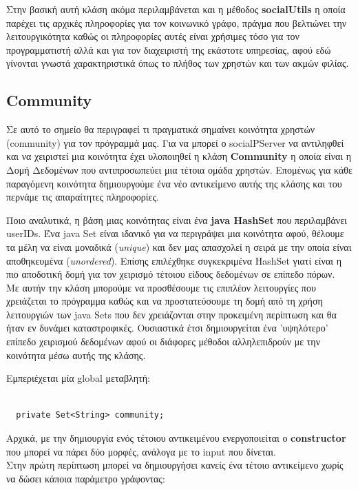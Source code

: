 Στην βασική αυτή κλάση ακόμα περιλαμβάνεται και η μέθοδος \textbf{socialUtils} η οποία παρέχει τις αρχικές πληροφορίες για τον κοινωνικό γράφο,
πράγμα που βελτιώνει την λειτουργικότητα καθώς οι πληροφορίες αυτές είναι χρήσιμες τόσο για τον προγραμματιστή
αλλά και για τον διαχειριστή της εκάστοτε υπηρεσίας, αφού εδώ γίνονται γνωστά χαρακτηριστικά όπως το πλήθος των χρηστών και των ακμών φιλίας.


\subsection{Community}
\label{Community}
\noindent
Σε αυτό το σημείο θα περιγραφεί τι πραγματικά σημαίνει κοινότητα χρηστών (community) για τον πρόγραμμά μας.
Για να μπορεί ο socialPServer να αντιληφθεί και να χειριστεί μια κοινότητα έχει υλοποιηθεί η κλάση \textbf{Community}
η οποία είναι η Δομή Δεδομένων που αντιπροσωπεύει μια τέτοια ομάδα χρηστών.
Επομένως για κάθε παραγόμενη κοινότητα δημιουργούμε ένα νέο αντικείμενο αυτής της κλάσης και του περνάμε τις απαραίτητες πληροφορίες.

Ποιο αναλυτικά, η βάση μιας κοινότητας είναι ένα \textbf{java HashSet} που περιλαμβάνει userIDs.
Ένα java Set είναι ιδανικό για να περιγράψει μια κοινότητα αφού, θέλουμε τα μέλη να είναι μοναδικά (\emph{unique}) 
και δεν μας απασχολεί η σειρά με την οποία είναι αποθηκευμένα (\emph{unordered}).
Επίσης επιλέχθηκε συγκεκριμένα HashSet γιατί είναι η πιο αποδοτική δομή για τον χειρισμό τέτοιου είδους δεδομένων σε επίπεδο πόρων.\\
Με αυτήν την κλάση μπορούμε να προσθέσουμε τις επιπλέον λειτουργίες που χρειάζεται το πρόγραμμα καθώς και να προστατεύσουμε τη δομή από τη χρήση λειτουργιών των java Sets που
δεν χρειάζονται στην προκειμένη περίπτωση και θα ήταν εν δυνάμει καταστροφικές. Ουσιαστικά έτσι δημιουργείται ένα 'υψηλότερο' επίπεδο χειρισμού δεδομένων αφού οι διάφορες μέθοδοι
αλληλεπιδρούν με την κοινότητα μέσω αυτής της κλάσης.

Εμπεριέχεται μία global μεταβλητή:
\begin{lstlisting}[frame=single]  % Start your code-block

  private Set<String> community;
\end{lstlisting}


Αρχικά, με την δημιουργία ενός τέτοιου αντικειμένου ενεργοποιείται ο   \textbf{constructor}  που μπορεί να πάρει δύο μορφές, ανάλογα με το input που δίνεται.\\
Στην πρώτη περίπτωση μπορεί να δημιουργήσει κανείς ένα τέτοιο αντικείμενο χωρίς να δώσει κάποια παράμετρο
γράφοντας:

